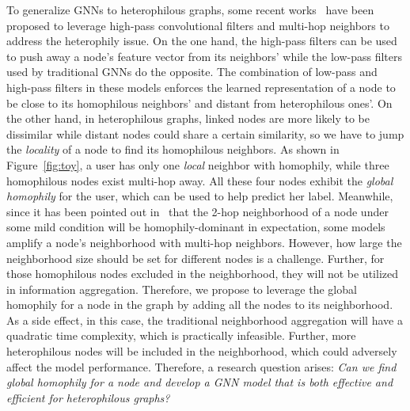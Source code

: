 \documentclass[nohyperref]{article}
\theoremstyle{plain}
\theoremstyle{definition}
\theoremstyle{remark}
\begin{document}
To generalize GNNs to heterophilous graphs,
some recent works~\cite{zhu2020beyond,bo2021beyond,chien2020adaptive} have been proposed
to leverage high-pass convolutional filters and multi-hop neighbors to address the heterophily issue. 
On the one hand,
the high-pass filters can be used to push away a node's feature vector from its neighbors' while 
the low-pass filters used by traditional GNNs 
do the opposite.
The combination of low-pass and high-pass filters in these models 
enforces the learned representation of a node 
to be close to its homophilous neighbors' and distant from heterophilous ones'.
On the other hand,
in heterophilous graphs,
linked nodes are more likely to be dissimilar while distant nodes could share a certain similarity,
so we have to jump the \emph{locality} of a node 
to find its homophilous neighbors.
As shown in Figure~\ref{fig:toy},
a user has only one \emph{local} neighbor with homophily,
while three homophilous nodes exist multi-hop away.
All these four nodes 
exhibit the \emph{global homophily} for the user,
which
can be used to help predict her label.
Meanwhile,
since it has been pointed out in~\cite{zhu2020beyond} that
the 2-hop neighborhood of a node under some mild condition will be homophily-dominant in expectation,
some models
amplify a node's neighborhood with multi-hop neighbors.
However,
how large the neighborhood size should be set for different nodes is a challenge.
Further, 
for those homophilous nodes excluded in the 
neighborhood,
they will not be utilized in information aggregation.
Therefore,
we propose to leverage 
the {global} homophily for a node in the graph by adding all the nodes to its neighborhood.
As a side effect,
in this case,
the traditional neighborhood aggregation will have a quadratic time complexity,
which is practically infeasible.
Further,
more heterophilous nodes will be included in the neighborhood, 
which could adversely affect the model performance.
Therefore,
a research question arises:
\emph{
Can we find global homophily for a node
and
develop a GNN model that is both effective and efficient for heterophilous graphs?}
\end{document}
